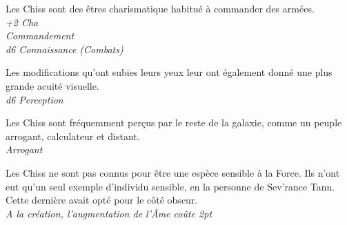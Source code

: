 \begin{description}[align=left]
\item [Charismatique] 			%
		Les Chiss sont des êtres charismatique habitué à commander des armées.\\
		\emph{+2 Cha}\\
		\emph{Commandement}\\
		\emph{d6 Connaissance (Combats)}

\item [Acuité visuelle] 		%
		Les modifications qu’ont subies leurs yeux leur ont également donné une plus grande acuité visuelle.\\
		\emph{d6 Perception}

\item [Arrogant] 				%
		Les Chiss sont fréquemment perçus par le reste de la galaxie, comme un peuple arrogant, calculateur et distant.\\
		\emph{Arrogant}
		
\item [Insensible à la Force] 		%
		Les Chiss ne sont pas connus pour être une espèce sensible à la Force. Ils n’ont eut qu’un seul exemple d’individu sensible, en la personne de Sev’rance Tann. Cette dernière avait opté pour le côté obscur.\\
		\emph{A la création, l’augmentation de l’\^Ame coûte 2pt}
\end{description}